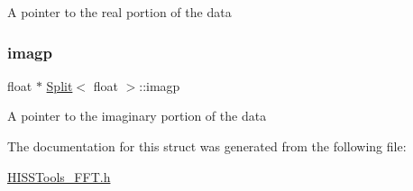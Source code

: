 A pointer to the real portion of the data \mbox{\label{_h_i_s_s_tools___f_f_t_8h_a21ff23a96abee0c0ed6a2433798c4eac}} 
\subsubsection{\texorpdfstring{imagp}{imagp}}
{\footnotesize\ttfamily float $\ast$ \hyperlink{_h_i_s_s_tools___f_f_t_8h_struct_split}{Split}$<$ float  $>$\+::imagp\hspace{0.3cm}{\ttfamily [inherited]}}

A pointer to the imaginary portion of the data 

The documentation for this struct was generated from the following file\+:\begin{DoxyCompactItemize}
\item 
\hyperlink{_h_i_s_s_tools___f_f_t_8h}{H\+I\+S\+S\+Tools\+\_\+\+F\+F\+T.\+h}\end{DoxyCompactItemize}

